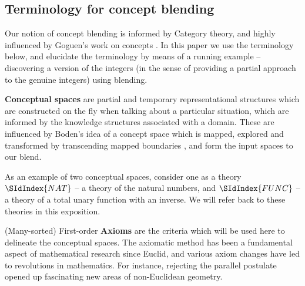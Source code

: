 

\subsection{Terminology for concept blending}
Our notion of concept blending is informed by Category theory, and
highly influenced by Goguen's work on concepts \cite{Gog05b}. In this paper we
use the terminology below, and elucidate the terminology by means of a
running example -- discovering a version of the integers (in the sense
of providing a partial approach to the genuine integers) using
blending.

{\bf Conceptual spaces} are partial and temporary representational
structures which are constructed on the fly when talking about a
particular situation, which are informed by the knowledge structures
associated with a domain. These are influenced by Boden's idea of a
concept space which is mapped, explored and transformed by
transcending mapped boundaries \cite{boden}, and form the input spaces
to our blend. 

As an example of two conceptual spaces, consider one as a theory
$\SIdIndex{NAT}$ --
a theory of the natural numbers, and $\SIdIndex{FUNC}$ -- a theory of a total
unary function with an inverse. 
We will refer back to these theories in this exposition.

(Many-sorted) First-order {\bf Axioms} are the criteria which will be
used here to delineate the conceptual
spaces. The axiomatic method has been a fundamental aspect of
mathematical research since Euclid, and various axiom changes have led
to revolutions in mathematics. For instance, 
rejecting
the parallel postulate opened up fascinating new areas of
non-Euclidean geometry.

